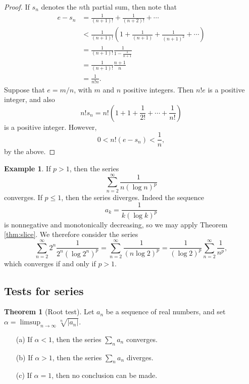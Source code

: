 \documentclass[12pt]{article}
\theoremstyle{definition}
\newtheorem{example}[definition]{Example}
\theoremstyle{theorem}
\newtheorem{theorem}[definition]{Theorem}
\begin{document}
\begin{proof}
If $s_n$ denotes the $n$th partial sum, then note that 
\begin{align*}
e - s_n &= \frac{1}{(n+1)!} + \frac{1}{(n+2)!} + \cdots \\
&< \frac{1}{(n+1)!}\left(1 + \frac{1}{(n+1)} + \frac{1}{(n+1)^2} + \cdots \right) \\
&= \frac{1}{(n+1)!} \frac{1}{1 - \frac{1}{n+1}} \\
&= \frac{1}{(n+1)!} \frac{n+1}{n} \\
&= \frac{1}{n!n}.
\end{align*}
Suppose that $e = m/n$, with $m$ and $n$ positive integers. Then $n!e$ is a positive integer, and also 
\[
n! s_n = n!\left(1 + 1 + \frac{1}{2!} + \cdots + \frac{1}{n!}\right)
\]
is a positive integer. However, 
\[
0 < n!(e - s_n) < \frac{1}{n},
\]
by the above. 
\end{proof}

\begin{example}
If $p > 1$, then the series 
\[
\sum_{n=2}^\infty \frac{1}{n (\log n)^p}
\]
converges. If $p \leqslant 1$, then the series diverges. Indeed the sequence 
\[
a_k = \frac{1}{k(\log k)^p}
\]
is nonnegative and monotonically decreasing, so we may apply Theorem \ref{thm:slice}. We therefore consider the series 
\[
\sum_{n=2}^\infty 2^n \frac{1}{2^n (\log2^n)^p} = \sum_{n=2}^\infty \frac{1}{(n \log 2)^p} = \frac{1}{(\log 2)^p}\sum_{n=2}^\infty \frac{1}{n^p},
\]
which converges if and only if $p  > 1$. 
\end{example}




\subsection{Tests for series}

\begin{theorem}[Root test]
Let $a_n$ be a sequence of real numbers, and set $\alpha = \limsup_{n \to \infty} \sqrt[n]{|a_n|}$. 
\begin{enumerate}
\item[(a)] If $\alpha < 1$, then the series $\sum_n a_n$ converges. 
\item[(b)] If $\alpha > 1$, then the series $\sum_n a_n$ diverges. 
\item[(c)] If $\alpha = 1$, then no conclusion can be made. 
\end{enumerate}
\end{theorem}
\end{document}

